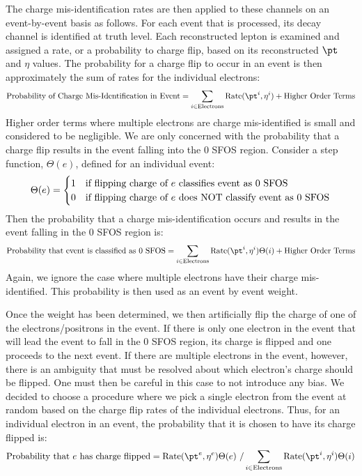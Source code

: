 The charge mis-identification rates are then applied to these channels on an event-by-event basis as follows.
For each event that is processed, its decay channel is identified at truth level. Each reconstructed lepton
is examined  and assigned a rate, or a probability to charge flip, based on its reconstructed $\pt$ and $\eta$ values.
The probability for a charge flip to occur in an event is then approximately the sum of rates for the individual electrons:
\begin{equation}
\textrm{Probability of Charge Mis-Identification in Event} = \sum_{i \in \textrm{Electrons}}  \textrm{Rate}(\pt^i,\eta^i) + \textrm{Higher Order Terms}
\end{equation}
Higher order terms where multiple electrons are charge mis-identified is small and considered to be negligible.
We are only concerned with the probability that a charge flip results in the event falling into the 0 SFOS region. 
Consider a step function, $\Theta(e)$, defined for an individual event:
\[
\Theta(e) = 
\begin{cases}
\hfill 1 \hfill & \text{if flipping charge of $e$ classifies event as 0 SFOS} \\
\hfill 0 \hfill & \text{if flipping charge of $e$ does NOT classify event as 0 SFOS}\\
\end{cases}
\]
Then the probability that a charge mis-identification occurs and results in the event falling in the 0 SFOS region is:
\begin{equation}
\textrm{Probability that event is classified as 0 SFOS} = \sum_{i \in \textrm{Electrons}}  \textrm{Rate}(\pt^i,\eta^i)\Theta(i) + \textrm{Higher Order Terms}
\end{equation}
Again, we ignore the case where multiple electrons have their charge mis-identified.  
This probability is then used as an event by event weight. 



Once the weight has been determined, we then artificially flip the charge of one of the electrons/positrons in the event.
If there is only one electron in the event that will lead the event to fall in the 0 SFOS region, its charge is flipped
and one proceeds to the next event.  If there are multiple electrons in the event, however, there is an ambiguity that must be resolved
about which electron's charge should be flipped. One must then be careful in this case to not introduce any bias.
We decided to choose a procedure where we pick a single electron from the event at random based on the charge flip rates
of the individual electrons. Thus, for an individual electron in an event, the probability that it is chosen to have its charge
flipped is:
\begin{equation}
\textrm{Probability that $e$ has charge flipped} = \textrm{Rate}(\pt^e,\eta^e)\Theta(e)~/\sum_{i \in \textrm{Electrons}} \textrm{Rate}(\pt^i,\eta^i)\Theta(i)
\end{equation}

